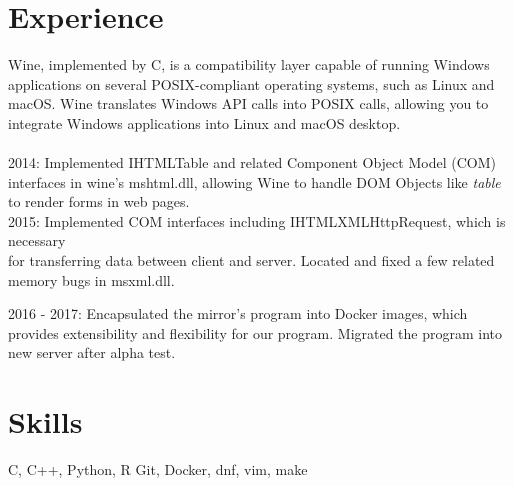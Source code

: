 

\section{Experience}

{
	{Wine, implemented by C, is a compatibility layer capable of running Windows applications on several %
	POSIX-compliant operating systems, such as Linux and macOS. Wine translates Windows API %
	calls into POSIX calls, allowing you to integrate Windows applications into Linux and %
	macOS desktop.\\ \\}
	{2014: Implemented IHTMLTable and related Component Object Model (COM) interfaces in wine's mshtml.dll, allowing Wine to handle DOM Objects like \textit{table} to render forms in web pages.}\\
	{2015: Implemented COM interfaces including IHTMLXMLHttpRequest, which is necessary \\
	for transferring data between client and server. Located and fixed a few related memory bugs in msxml.dll.}
}





{
2016 - 2017: 
Encapsulated the mirror's program into Docker images, which provides extensibility
and flexibility for our program. Migrated the program into new server after alpha test.
}

\vspace{-5mm}

\section{Skills}
{ C, C++, Python, R
	}
{Git, Docker, dnf, vim, make
	}
%




